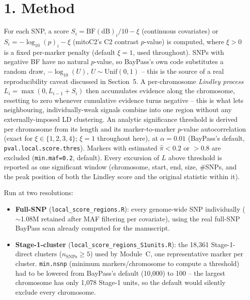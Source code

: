 \documentclass[11pt]{article}
\begin{document}
\section*{\color{Accent}1. Method}
For each SNP, a score $S_i = \mathrm{BF(dB)}_i/10 - \xi$ (continuous covariates) or
$S_i = -\log_{10}(p)_i - \xi$ (mitoC2's C2 contrast $p$-value) is computed, where $\xi>0$ is a
fixed per-marker penalty (default $\xi=1$, used throughout). SNPs with negative BF have no
natural $p$-value, so BayPass's own code substitutes a random draw,
$-\log_{10}(U)$, $U\sim\mathrm{Unif}(0,1)$ -- this is the source of a real reproducibility
caveat discussed in Section~5. A per-chromosome \emph{Lindley process}
$L_i=\max(0, L_{i-1}+S_i)$ then accumulates evidence along the chromosome, resetting to zero
whenever cumulative evidence turns negative -- this is what lets neighbouring,
individually-weak signals combine into one region without any externally-imposed LD
clustering. An analytic significance threshold is derived per chromosome from its length and
its marker-to-marker $p$-value autocorrelation (exact for $\xi\in\{1,2,3,4\}$;
$\xi=1$ throughout here), at $\alpha=0.01$ (BayPass's default, \texttt{pval.local.score.thres}).
Markers with estimated $\hat\pi<0.2$ or $>0.8$ are excluded (\texttt{min.maf=0.2}, default).
Every excursion of $L$ above threshold is reported as one significant window
(chromosome, start, end, size, \#SNPs, and the peak position of both the Lindley score and
the original statistic within it).

Run at two resolutions:
\begin{itemize}
  \item \textbf{Full-SNP} (\texttt{local\_score\_regions.R}): every genome-wide SNP
    individually ($\sim$1.08M retained after MAF filtering per covariate), using the real
    full-SNP BayPass scan already computed for the manuscript.
  \item \textbf{Stage-1-cluster} (\texttt{local\_score\_regions\_S1units.R}): the 18{,}361
    Stage-1-direct clusters ($n_{\mathrm{SNPs}}\geq5$) used by Module~C, one representative
    marker per cluster. \texttt{min.nsnp} (minimum markers/chromosome to compute a threshold)
    had to be lowered from BayPass's default (10{,}000) to 100 -- the largest chromosome has
    only 1{,}078 Stage-1 units, so the default would silently exclude every chromosome.
\end{itemize}
\end{document}
